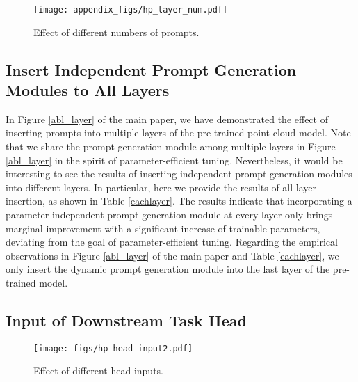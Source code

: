 \documentclass[10pt,twocolumn,letterpaper]{article}
\begin{document}
\begin{figure}[h]
\centering
\texttt{[image: appendix\_figs/hp\_layer\_num.pdf]} 
\caption{Effect of different numbers of prompts.}
\label{layer_num}
\end{figure}

\subsection{Insert Independent Prompt Generation Modules to All Layers}

In Figure \ref{abl_layer} of the main paper, we have demonstrated the effect of inserting prompts into multiple layers of the pre-trained point cloud model. 
Note that we share the prompt generation module among multiple layers in Figure \ref{abl_layer} in the spirit of parameter-efficient tuning. 
Nevertheless, it would be interesting to see the results of inserting independent prompt generation modules into different layers. 
In particular, here we provide the results of all-layer insertion, as shown in Table \ref{eachlayer}. 
The results indicate that incorporating a parameter-independent prompt generation module at every layer only brings marginal improvement with a significant increase of trainable parameters, deviating from the goal of parameter-efficient tuning. 
Regarding the empirical observations in Figure \ref{abl_layer} of the main paper and Table \ref{eachlayer}, we only insert the dynamic prompt generation module into the last layer of the pre-trained model.

\begin{table}[h]
  \centering
  \caption{Effect of inserting independent prompt modules to all layers. PM indicates the dynamic prompt generation module.}
  \label{eachlayer}\end{table}

\subsection{Input of Downstream Task Head} 
\begin{figure}[h]
\centering
\texttt{[image: figs/hp\_head\_input2.pdf]} 
\caption{Effect of different head inputs.}
\label{abl_head}
\end{figure}
\end{document}
